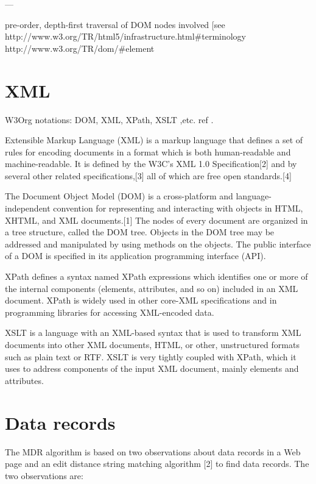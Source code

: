 ---

pre-order, depth-first traversal of DOM nodes involved [see 
http://www.w3.org/TR/html5/infrastructure.html\#terminology
http://www.w3.org/TR/dom/\#element


\section{XML}

W3Org notations: DOM, XML, XPath, XSLT ,etc. ref \cite{Myllymaki02robustweb}.

Extensible Markup Language (XML) is a markup language that defines a set of rules for encoding documents in a format which is both human-readable and machine-readable. It is defined by the W3C's XML 1.0 Specification[2] and by several other related specifications,[3] all of which are free open standards.[4]

The Document Object Model (DOM) is a cross-platform and language-independent convention for representing and interacting with objects in HTML, XHTML, and XML documents.[1] The nodes of every document are organized in a tree structure, called the DOM tree. Objects in the DOM tree may be addressed and manipulated by using methods on the objects. The public interface of a DOM is specified in its application programming interface (API).

XPath defines a syntax named XPath expressions which identifies one or more of the internal components (elements, attributes, and so on) included in an XML document. XPath is widely used in other core-XML specifications and in programming libraries for accessing XML-encoded data.

XSLT is a language with an XML-based syntax that is used to transform XML documents into other XML documents, HTML, or other, unstructured formats such as plain text or RTF. XSLT is very tightly coupled with XPath, which it uses to address components of the input XML document, mainly elements and attributes.


\section{Data records}

The MDR algorithm is based on two observations about data
records in a Web page and an edit distance string matching
algorithm [2] to find data records. The two observations are:

